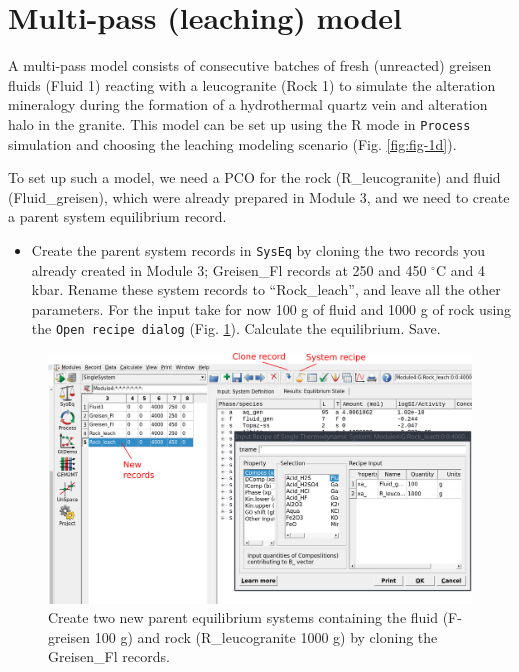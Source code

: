 \documentclass[
]{book}
\providecommand{\tightlist}{%
  \setlength{\itemsep}{0pt}\setlength{\parskip}{0pt}}
\begin{document}
\hypertarget{multi-pass-leaching-model}{%
\section{Multi-pass (leaching) model}\label{multi-pass-leaching-model}}

A multi-pass model consists of consecutive batches of fresh (unreacted) greisen fluids (Fluid 1) reacting with a leucogranite (Rock 1) to simulate the alteration mineralogy during the formation of a hydrothermal quartz vein and alteration halo in the granite. This model can be set up using the R mode in \texttt{Process} simulation and choosing the leaching modeling scenario (Fig. \ref{fig:fig-1d}).

To set up such a model, we need a PCO for the rock (R\_leucogranite) and fluid (Fluid\_greisen), which were already prepared in Module 3, and we need to create a parent system equilibrium record.

\begin{itemize}
\tightlist
\item
  Create the parent system records in \texttt{SysEq} by cloning the two records you already created in Module 3; Greisen\_Fl records at 250 and 450 \(^\circ\)C and 4 kbar. Rename these system records to ``Rock\_leach'', and leave all the other parameters. For the input take for now 100 g of fluid and 1000 g of rock using the \texttt{Open\ recipe\ dialog} (Fig. \ref{fig:fig-2d}). Calculate the equilibrium. Save.
\end{itemize}

\begin{figure}
\includegraphics[width=1\linewidth]{figures/module4/fig-2} \caption{Create two new parent equilibrium systems containing the fluid (F-greisen 100 g) and rock (R\_leucogranite 1000 g) by cloning the Greisen\_Fl records.}\label{fig:fig-2d}
\end{figure}
\end{document}
